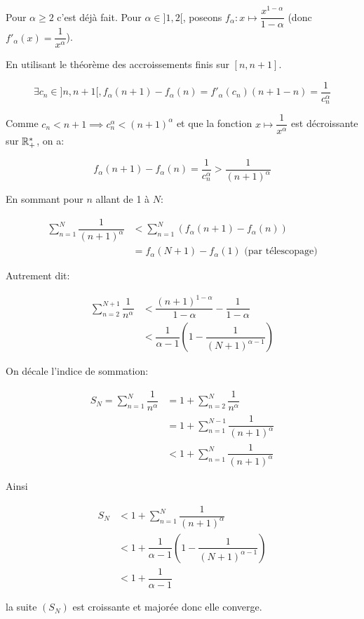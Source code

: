 \documentclass[a4paper, 12pt]{article}
\begin{document}
\begin{demonstration}
    Pour $\alpha \geq 2$ c'est déjà fait.\n
    Pour $\alpha \in ]1, 2[$, poseons $f_\alpha : x \mapsto \dfrac{x^{1 - \alpha}}{1 - \alpha}$ (donc $f'_\alpha(x) = \dfrac{1}{x^\alpha}$).

    En utilisant le théorème des accroissements finis sur $[n, n+1]$.

    $$
    \exists c_n \in ]n, n+1[, f_\alpha(n+1) - f_\alpha(n) = f'_\alpha(c_n)(n+1 - n) = \dfrac{1}{c_n^\alpha}
    $$
    
    Comme $c_n \lt n+1 \implies c_n^\alpha \lt (n+1)^\alpha$ et que la fonction $x \mapsto \dfrac{1}{x^\alpha}$ est décroissante sur $\mathbb{R}_+^*$, on a:

    $$
    f_\alpha(n+1) - f_\alpha(n) = \dfrac{1}{c_n^\alpha} \gt \dfrac{1}{(n+1)^\alpha}
    $$

    En sommant pour $n$ allant de 1 à $N$:

    \begin{align*}
        \sum\limits_{n=1}^{N} \dfrac{1}{(n+1)^\alpha} &\lt \sum\limits_{n=1}^{N} \left(f_\alpha(n+1) - f_\alpha(n)\right)\\
        &= f_\alpha(N+1) - f_\alpha(1) \text{ (par télescopage)}
    \end{align*}

    Autrement dit:

    \begin{align*}
        \sum\limits_{n=2}^{N+1} \dfrac{1}{n^\alpha} &\lt \dfrac{(n+1)^{1 - \alpha}}{1 - \alpha} - \dfrac{1}{1 - \alpha}\\
        &\lt \dfrac{1}{\alpha - 1} \left(1 - \dfrac{1}{(N+1)^{\alpha - 1}}\right)
    \end{align*}

    On décale l'indice de sommation:

    \begin{align*}
        S_N = \sum\limits_{n=1}^{N} \dfrac{1}{n^\alpha} &= 1 + \sum\limits_{n=2}^{N} \dfrac{1}{n^\alpha}\\
        &= 1 + \sum\limits_{n=1}^{N-1} \dfrac{1}{(n+1)^\alpha}\\
        &\lt 1 + \sum\limits_{n=1}^{N} \dfrac{1}{(n+1)^\alpha}
    \end{align*}

    Ainsi

    \begin{align*}
        S_N &\lt 1 + \sum\limits_{n=1}^{N} \dfrac{1}{(n+1)^\alpha}\\
        &\lt 1 + \dfrac{1}{\alpha - 1} \left(1 - \dfrac{1}{(N+1)^{\alpha - 1}}\right)\\
        &\lt 1 + \dfrac{1}{\alpha - 1}
    \end{align*}

    la suite $(S_N)$ est croissante et majorée donc elle converge.
\end{demonstration}
\end{document}
